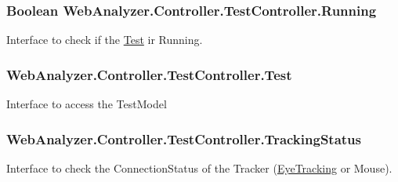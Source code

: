 \subsubsection[{Running}]{\setlength{\rightskip}{0pt plus 5cm}Boolean Web\+Analyzer.\+Controller.\+Test\+Controller.\+Running\hspace{0.3cm}{\ttfamily [get]}}\label{class_web_analyzer_1_1_controller_1_1_test_controller_a4020785450ade4a26f603d667ce633d6}


Interface to check if the \hyperlink{namespace_web_analyzer_1_1_test}{Test} ir Running. 

\hypertarget{class_web_analyzer_1_1_controller_1_1_test_controller_afcf9572f80c31e6d9aca33f96e3aaa4f}{}
\subsubsection[{Test}]{ Web\+Analyzer.\+Controller.\+Test\+Controller.\+Test\hspace{0.3cm}{\ttfamily [get]}}\label{class_web_analyzer_1_1_controller_1_1_test_controller_afcf9572f80c31e6d9aca33f96e3aaa4f}


Interface to access the Test\+Model 

\hypertarget{class_web_analyzer_1_1_controller_1_1_test_controller_adc0db19e3cc5958f24dd5fd09ce34d98}{}
\subsubsection[{Tracking\+Status}]{ Web\+Analyzer.\+Controller.\+Test\+Controller.\+Tracking\+Status\hspace{0.3cm}{\ttfamily [get]}}\label{class_web_analyzer_1_1_controller_1_1_test_controller_adc0db19e3cc5958f24dd5fd09ce34d98}


Interface to check the Connection\+Status of the Tracker (\hyperlink{namespace_web_analyzer_1_1_eye_tracking}{Eye\+Tracking} or Mouse). 

